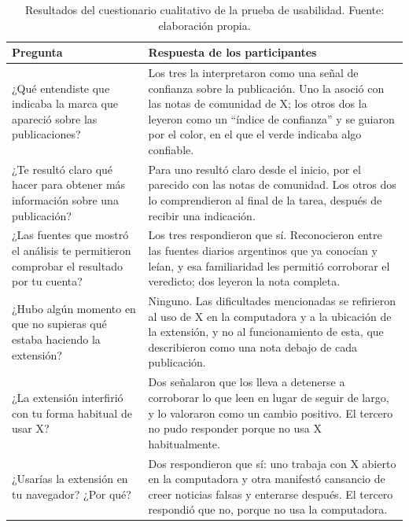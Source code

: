 \begin{table}[t]
  \centering
  \small
  \caption{Resultados del cuestionario cualitativo de la prueba de usabilidad. Fuente: elaboración propia.}
  \label{tab:cuestionario-usabilidad}
  \begin{tabular}{@{}p{6.4cm} p{8.8cm}@{}}
    \hline
    \textbf{Pregunta} & \textbf{Respuesta de los participantes} \\
    \hline
    ¿Qué entendiste que indicaba la marca que apareció sobre las publicaciones? & Los tres la interpretaron como una señal de confianza sobre la publicación. Uno la asoció con las notas de comunidad de X; los otros dos la leyeron como un \enquote{índice de confianza} y se guiaron por el color, en el que el verde indicaba algo confiable. \\
    ¿Te resultó claro qué hacer para obtener más información sobre una publicación? & Para uno resultó claro desde el inicio, por el parecido con las notas de comunidad. Los otros dos lo comprendieron al final de la tarea, después de recibir una indicación. \\
    ¿Las fuentes que mostró el análisis te permitieron comprobar el resultado por tu cuenta? & Los tres respondieron que sí. Reconocieron entre las fuentes diarios argentinos que ya conocían y leían, y esa familiaridad les permitió corroborar el veredicto; dos leyeron la nota completa. \\
    ¿Hubo algún momento en que no supieras qué estaba haciendo la extensión? & Ninguno. Las dificultades mencionadas se refirieron al uso de X en la computadora y a la ubicación de la extensión, y no al funcionamiento de esta, que describieron como una nota debajo de cada publicación. \\
    ¿La extensión interfirió con tu forma habitual de usar X? & Dos señalaron que los lleva a detenerse a corroborar lo que leen en lugar de seguir de largo, y lo valoraron como un cambio positivo. El tercero no pudo responder porque no usa X habitualmente. \\
    ¿Usarías la extensión en tu navegador? ¿Por qué? & Dos respondieron que sí: uno trabaja con X abierto en la computadora y otra manifestó cansancio de creer noticias falsas y enterarse después. El tercero respondió que no, porque no usa la computadora. \\
    \hline
  \end{tabular}
\end{table}

